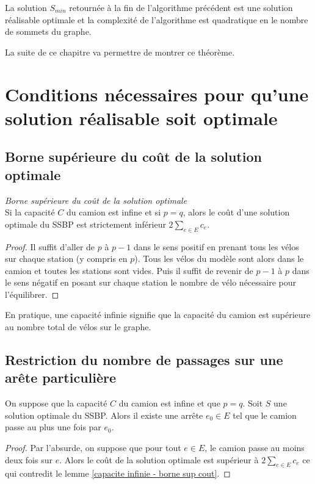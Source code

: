 \begin{thm}
La solution $S_{min}$ retournée à la fin de l'algorithme précédent est une solution réalisable optimale et la complexité de l'algorithme est quadratique en le nombre de sommets du graphe.
\end{thm}

La suite de ce chapitre va permettre de montrer ce théorème.

\section{Conditions nécessaires pour qu'une solution réalisable soit optimale}

\subsection{Borne supérieure du coût de la solution optimale}

\begin{lem}\label{capacite infinie - borne sup cout}
\emph{Borne supérieure du coût de la solution optimale}\\
Si la capacité $C$ du camion est infine et si $p=q$, alors le coût d'une solution optimale du SSBP est strictement inférieur $\displaystyle 2\sum_{e \in E}c_e$.
\end{lem}

\begin{proof}
Il suffit d'aller de $p$ à $p-1$ dans le sens positif en prenant tous les vélos sur chaque station (y compris en $p$). Tous les vélos du modèle sont alors dans le camion et toutes les stations sont vides. Puis il suffit de revenir de $p-1$ à $p$ dans le sens négatif en posant sur chaque station le nombre de vélo nécessaire pour l'équilibrer.
\end{proof}

En pratique, une capacité infinie signifie que la capacité du camion est supérieure au nombre total de vélos sur le graphe.

\subsection{Restriction du nombre de passages sur une arête particulière}

\begin{prop}
On suppose que la capacité $C$ du camion est infine et que $p=q$. Soit $S$ une solution optimale du SSBP. Alors il existe une arrête $e_0 \in E$ tel que le camion passe au plus une fois par $e_0$.
\end{prop}

\begin{proof}
Par l'absurde, on suppose que pour tout $e \in E$, le camion passe au moins deux fois sur $e$. Alors le coût de la solution optimale est supérieur à $2\sum_{e \in E}c_e$ ce qui contredit le lemme \ref{capacite infinie - borne sup cout}.
\end{proof}